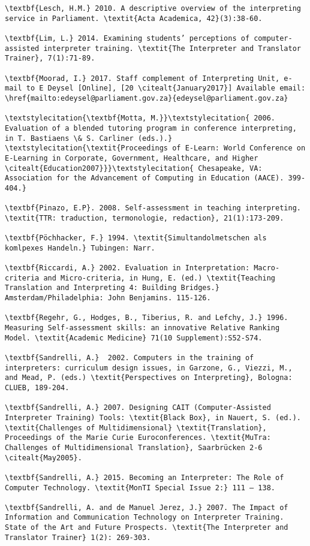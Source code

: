 \documentclass[output=paper]{langsci/langscibook}
\begin{document}
\begin{verbatim}
\textbf{Lesch, H.M.} 2010. A descriptive overview of the interpreting service in Parliament. \textit{Acta Academica, 42}(3):38-60.

\textbf{Lim, L.} 2014. Examining students’ perceptions of computer-assisted interpreter training. \textit{The Interpreter and Translator Trainer}, 7(1):71-89. 

\textbf{Moorad, I.} 2017. Staff complement of Interpreting Unit, e-mail to E Deysel [Online], [20 \citealt{January2017}] Available email: \href{mailto:edeysel@parliament.gov.za}{edeysel@parliament.gov.za} 

\textstylecitation{\textbf{Motta, M.}}\textstylecitation{ 2006. Evaluation of a blended tutoring program in conference interpreting, in T. Bastiaens \& S. Carliner (eds.).} \textstylecitation{\textit{Proceedings of E-Learn: World Conference on E-Learning in Corporate, Government, Healthcare, and Higher \citealt{Education2007}}}\textstylecitation{ Chesapeake, VA: Association for the Advancement of Computing in Education (AACE). 399-404.}

\textbf{Pinazo, E.P}. 2008. Self-assessment in teaching interpreting. \textit{TTR: traduction, termonologie, redaction}, 21(1):173-209.

\textbf{Pöchhacker, F.} 1994. \textit{Simultandolmetschen als komlpexes Handeln.} Tubingen: Narr. 

\textbf{Riccardi, A.} 2002. Evaluation in Interpretation: Macro-criteria and Micro-criteria, in Hung, E. (ed.) \textit{Teaching Translation and Interpreting 4: Building Bridges.} Amsterdam/Philadelphia: John Benjamins. 115-126.

\textbf{Regehr, G., Hodges, B., Tiberius, R. and Lefchy, J.} 1996. Measuring Self-assessment skills: an innovative Relative Ranking Model. \textit{Academic Medicine} 71(10 Supplement):S52-S74.

\textbf{Sandrelli, A.}  2002. Computers in the training of interpreters: curriculum design issues, in Garzone, G., Viezzi, M., and Mead, P. (eds.) \textit{Perspectives on Interpreting}, Bologna: CLUEB, 189-204.

\textbf{Sandrelli, A.} 2007. Designing CAIT (Computer-Assisted Interpreter Training) Tools: \textit{Black Box}, in Nauert, S. (ed.). \textit{Challenges of Multidimensional} \textit{Translation}, Proceedings of the Marie Curie Euroconferences. \textit{MuTra: Challenges of Multidimensional Translation}, Saarbrücken 2-6 \citealt{May2005}. 

\textbf{Sandrelli, A.} 2015. Becoming an Interpreter: The Role of Computer Technology. \textit{MonTI Special Issue 2:} 111 – 138.

\textbf{Sandrelli, A. and de Manuel Jerez, J.} 2007. The Impact of Information and Communication Technology on Interpreter Training. State of the Art and Future Prospects. \textit{The Interpreter and Translator Trainer} 1(2): 269-303.
\end{verbatim}
\end{document}
